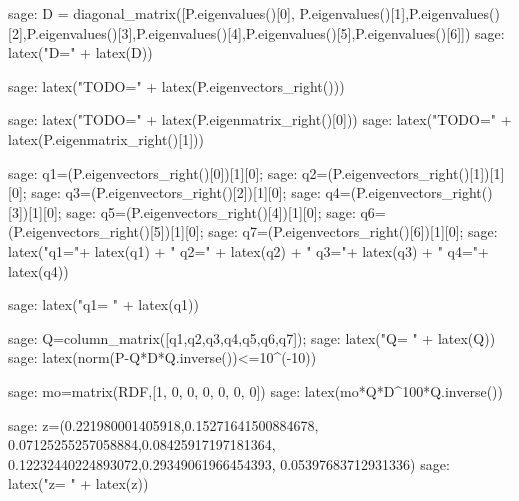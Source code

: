 \begin{sagecommandline}
    sage: D = diagonal_matrix([P.eigenvalues()[0], P.eigenvalues()[1],P.eigenvalues()[2],P.eigenvalues()[3],P.eigenvalues()[4],P.eigenvalues()[5],P.eigenvalues()[6]])
    sage: latex("D=" + latex(D))
\end{sagecommandline}
    
\begin{sagecommandline}
    sage: latex("TODO=" + latex(P.eigenvectors_right()))
\end{sagecommandline}
    
\begin{sagecommandline}
    sage: latex("TODO=" + latex(P.eigenmatrix_right()[0]))
    sage: latex("TODO=" + latex(P.eigenmatrix_right()[1]))
\end{sagecommandline}
    
\begin{sagecommandline}
    sage: q1=(P.eigenvectors_right()[0])[1][0];
    sage: q2=(P.eigenvectors_right()[1])[1][0];
    sage: q3=(P.eigenvectors_right()[2])[1][0];
    sage: q4=(P.eigenvectors_right()[3])[1][0];
    sage: q5=(P.eigenvectors_right()[4])[1][0];
    sage: q6=(P.eigenvectors_right()[5])[1][0];
    sage: q7=(P.eigenvectors_right()[6])[1][0];
    sage: latex("q1="+ latex(q1) + " q2=" + latex(q2) + " q3="+ latex(q3) + " q4="+ latex(q4))
\end{sagecommandline}
    
\begin{sagecommandline}
    sage: latex("q1= " + latex(q1))
\end{sagecommandline}
    
\begin{sagecommandline}
    sage: Q=column_matrix([q1,q2,q3,q4,q5,q6,q7]);
    sage: latex("Q= " + latex(Q))
    sage: latex(norm(P-Q*D*Q.inverse())<=10^(-10))
\end{sagecommandline}
    
\begin{sagecommandline}
    sage: mo=matrix(RDF,[1, 0, 0, 0, 0, 0, 0])
    sage: latex(mo*Q*D^100*Q.inverse())
\end{sagecommandline}
    
\begin{sagecommandline}
    sage: z=(0.221980001405918,0.15271641500884678, 0.07125255257058884,0.08425917197181364, 0.12232440224893072,0.29349061966454393, 0.05397683712931336)
    sage: latex("z= " + latex(z))
\end{sagecommandline}
    
